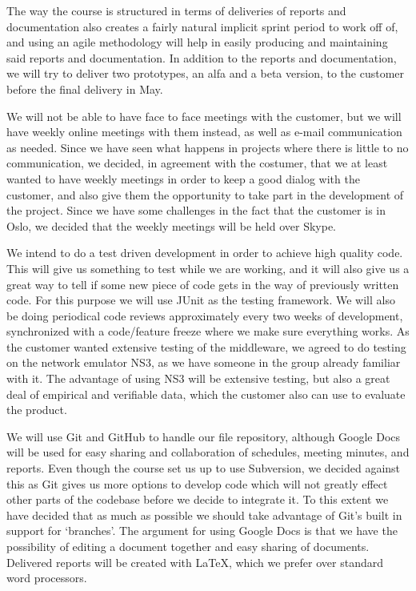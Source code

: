 \documentclass[12pt]{article}
\begin{document}
    The way the course is structured in terms of deliveries of reports and documentation also creates a fairly natural implicit sprint period to work off of, and using an agile methodology will help in easily producing and maintaining said reports and documentation. In addition to the  reports and documentation, we will try to deliver two prototypes, an alfa and a beta version, to the customer before the final delivery in May.

    We will not be able to have face to face meetings with the customer, but we will have weekly online meetings with them instead, as well as e-mail communication as needed. Since we have seen what happens in projects where there is little to no communication, we decided, in agreement with the costumer, that we at least wanted to have weekly meetings in order  to keep a good dialog with the customer, and also give them the opportunity to take part in the development of the project. Since we have some challenges in the fact that the customer is in Oslo, we decided that the weekly meetings will be held over Skype.

    We  intend to do a test driven development in order to achieve high quality code. This will give us something to test while we are working, and it will also give us a great way to tell if some new piece of code gets in the way of previously written code. For this purpose we will use JUnit as the testing framework. We will also be doing periodical code reviews approximately every two weeks of development, synchronized with a code/feature freeze where we make sure everything works. As the customer wanted extensive testing of the middleware, we agreed to do testing on the network emulator NS3, as we have someone in the group already familiar with it. The advantage of using NS3 will be extensive testing, but also a great deal of empirical and verifiable data, which the customer also can use to evaluate the product.

    We will use Git and GitHub to handle our file repository, although Google Docs will be used for easy sharing and collaboration of schedules, meeting minutes, and reports. Even though the course set us up to use Subversion, we decided against this as Git gives us more options to develop code which will not greatly effect other parts of the codebase before we decide to integrate it. To this extent we have decided that as much as possible we should take advantage of Git’s built in support for ‘branches’. The argument for using Google Docs is that we have the possibility of editing a document together and easy sharing of documents. Delivered reports will be created with LaTeX, which we prefer over standard word processors.
\end{document}
